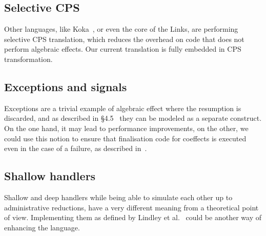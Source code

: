\documentclass[declaration,shortabstract]{iithesis}
\theoremstyle{definition} \newtheorem{definition}{Definition}[chapter]
\theoremstyle{remark} \newtheorem{remark}[definition]{Observation}
\theoremstyle{plain} \newtheorem{theorem}[definition]{Theorem}
\theoremstyle{plain} \newtheorem{lemma}[definition]{Lemma}
\begin{document}
    \subsection{Selective CPS}

    Other languages, like Koka~\cite{leijen-koka}, or even the core of the Links,
    are performing selective CPS translation, which reduces the overhead on code
    that does not perform algebraic effects. Our current translation is fully
    embedded in CPS transformation.

    \subsection{Exceptions and signals}

    Exceptions are a trivial example of algebraic effect where the resumption is
    discarded, and as described in \S 4.5~\cite{handlers-cps} they can be
    modeled as a separate construct. On the one hand, it may lead to
    performance improvements, on the other, we could use this notion to ensure
    that finalisation code for coeffects is executed even in the case of a
    failure, as described in~\cite{runners-in-action}.

    \subsection{Shallow handlers}

    Shallow and deep handlers while being able to simulate each other up to
    administrative reductions, have a very different meaning from a theoretical point
    of view. Implementing them as defined by Lindley et al.~\cite{shallow-handlers}
    could be another way of enhancing the language.



\printbibliography{}
\end{document}
